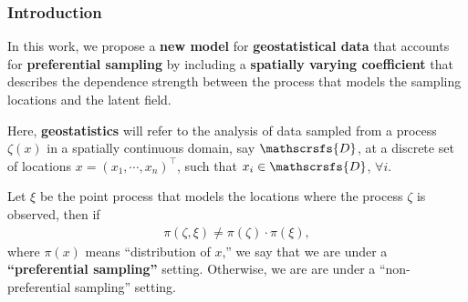 \documentclass[10pt, aspectratio = 169, handout]{beamer} %
\let\oldtextbf\textbf
\renewcommand\textbf[1]{\textcolor{titles}{\oldtextbf{#1}}}
\begin{document}
	\begin{frame}[t]
		\frametitle{Introduction}
		\justifying

        In this work, we propose a \textbf{new model} for \textbf{geostatistical data} that accounts for \textbf{preferential sampling} by including a \textbf{spatially varying coefficient} that describes the dependence strength between the process that models the sampling locations and the latent field. \vspace{12pt}

        \pause

        Here, \textbf{geostatistics} will refer to the analysis of data sampled from a process $\zeta(x)$ in a spatially continuous domain, say $\mathscrsfs{D}$, at a discrete set of locations $x = (x_1, \cdots, x_n)^{\top}$, such that $x_i \in \mathscrsfs{D}$, $\forall i$. \vspace{12pt}

        \pause

        Let $\xi$ be the point process that models the locations where the process $\zeta$ is observed, then if
        \begin{align*}
            \pi(\zeta, \xi) \neq \pi(\zeta) \cdot \pi(\xi),
        \end{align*}
        where $\pi(x)$ means ``distribution of $x$,'' we say that we are under a \textbf{``preferential sampling''} setting. Otherwise, we are are under a ``non-preferential sampling'' setting.
	\end{frame}
\end{document}
